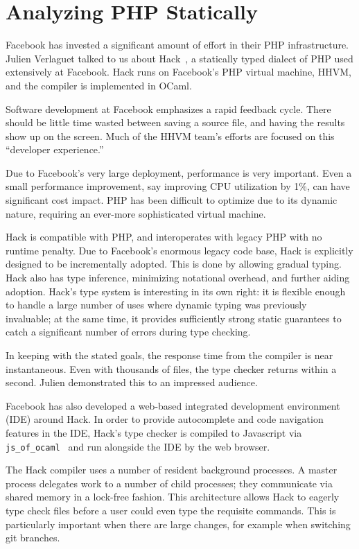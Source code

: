 \documentclass{jfp1}
\begin{document}
\section{Analyzing PHP Statically}


Facebook has invested a significant amount of effort in their PHP
infrastructure. Julien Verlaguet talked to us about
Hack~\cite{Verlaguet:2014:Hack}, a statically typed dialect of PHP
used extensively at Facebook. Hack runs on Facebook's PHP virtual
machine, HHVM, and the compiler is implemented in OCaml.

Software development at Facebook emphasizes a rapid feedback cycle.
There should be little time wasted between saving a source file, and
having the results show up on the screen. Much of the HHVM team's
efforts are focused on this ``developer experience.''

Due to Facebook's very large deployment, performance is very important.
Even a small performance improvement, say improving CPU utilization 
by 1\%, can have significant cost impact. PHP has been difficult to optimize
due to its dynamic nature, requiring an ever-more sophisticated 
virtual machine.

Hack is compatible with PHP, and interoperates with legacy PHP
with no runtime penalty. Due to Facebook's enormous legacy code base, 
Hack is explicitly designed to be incrementally adopted. This is done
by allowing gradual typing. Hack also has type inference, minimizing
notational overhead, and further aiding adoption. Hack's type system
is interesting in its own right: it is flexible enough to handle a large
number of uses where dynamic typing was previously invaluable; at
the same time, it provides sufficiently strong static guarantees to catch
a significant number of errors during type checking.

In keeping with the stated goals, the response time from the compiler
is near instantaneous. Even with thousands of files, the type checker 
returns within a second. Julien demonstrated this to an impressed 
audience.

Facebook has also developed a web-based integrated development
environment (IDE) around Hack. In order to provide autocomplete and
code navigation features in the IDE, Hack's type checker is compiled 
to Javascript via \texttt{js\_of\_ocaml}~\cite{DBLP:journals/spe/VouillonB14} and run alongside the 
IDE by the web browser.

The Hack compiler uses a number of resident background processes. A
master process delegates work to a number of child processes; they
communicate via shared memory in a lock-free fashion. This
architecture allows Hack to eagerly type check files before a user
could even type the requisite commands. This is particularly important
when there are large changes, for example when switching git branches.
\end{document}
